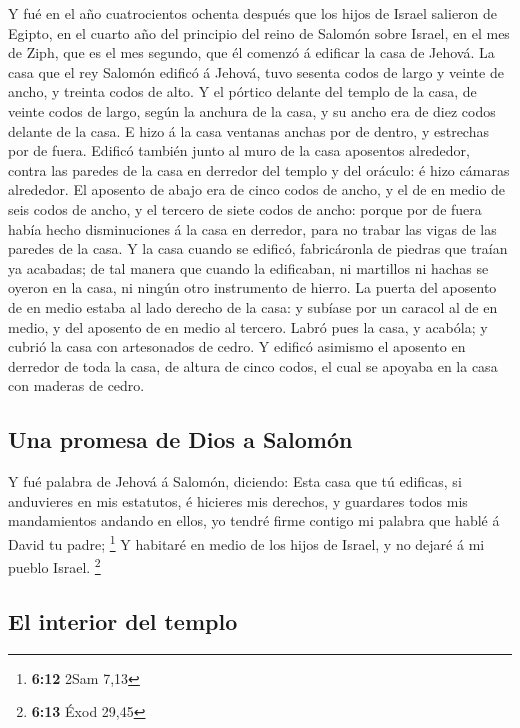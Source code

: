  Y fué en el año cuatrocientos ochenta después que los
hijos de Israel salieron de Egipto, en el cuarto año del principio del
reino de Salomón sobre Israel, en el mes de Ziph, que es el mes segundo,
que él comenzó á edificar la casa de Jehová.  La casa que
el rey Salomón edificó á Jehová, tuvo sesenta codos de largo y veinte de
ancho, y treinta codos de alto.  Y el pórtico delante del
templo de la casa, de veinte codos de largo, según la anchura de la
casa, y su ancho era de diez codos delante de la casa.  E
hizo á la casa ventanas anchas por de dentro, y estrechas por de fuera.
 Edificó también junto al muro de la casa aposentos
alrededor, contra las paredes de la casa en derredor del templo y del
oráculo: é hizo cámaras alrededor.  El aposento de abajo
era de cinco codos de ancho, y el de en medio de seis codos de ancho, y
el tercero de siete codos de ancho: porque por de fuera había hecho
disminuciones á la casa en derredor, para no trabar las vigas de las
paredes de la casa.  Y la casa cuando se edificó,
fabricáronla de piedras que traían ya acabadas; de tal manera que cuando
la edificaban, ni martillos ni hachas se oyeron en la casa, ni ningún
otro instrumento de hierro.  La puerta del aposento de en
medio estaba al lado derecho de la casa: y subíase por un caracol al de
en medio, y del aposento de en medio al tercero.  Labró
pues la casa, y acabóla; y cubrió la casa con artesonados de cedro.
 Y edificó asimismo el aposento en derredor de toda la
casa, de altura de cinco codos, el cual se apoyaba en la casa con
maderas de cedro.

\hypertarget{una-promesa-de-dios-a-salomuxf3n}{%
\subsection{Una promesa de Dios a
Salomón}\label{una-promesa-de-dios-a-salomuxf3n}}

 Y fué palabra de Jehová á Salomón, diciendo:
 Esta casa que tú edificas, si anduvieres en mis
estatutos, é hicieres mis derechos, y guardares todos mis mandamientos
andando en ellos, yo tendré firme contigo mi palabra que hablé á David
tu padre; \footnote{\textbf{6:12} 2Sam 7,13}  Y habitaré
en medio de los hijos de Israel, y no dejaré á mi pueblo Israel.
\footnote{\textbf{6:13} Éxod 29,45}

\hypertarget{el-interior-del-templo}{%
\subsection{El interior del templo}\label{el-interior-del-templo}}

